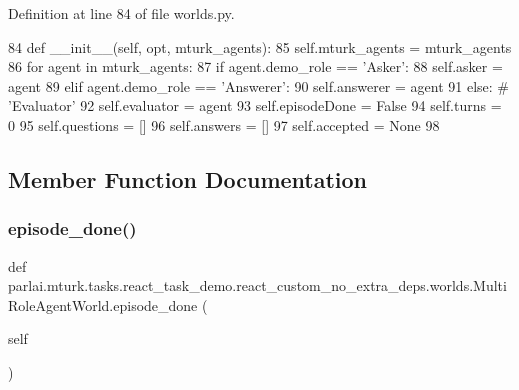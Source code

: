 Definition at line 84 of file worlds.\+py.


\begin{DoxyCode}
84     \textcolor{keyword}{def }\_\_init\_\_(self, opt, mturk\_agents):
85         self.mturk\_agents = mturk\_agents
86         \textcolor{keywordflow}{for} agent \textcolor{keywordflow}{in} mturk\_agents:
87             \textcolor{keywordflow}{if} agent.demo\_role == \textcolor{stringliteral}{'Asker'}:
88                 self.asker = agent
89             \textcolor{keywordflow}{elif} agent.demo\_role == \textcolor{stringliteral}{'Answerer'}:
90                 self.answerer = agent
91             \textcolor{keywordflow}{else}:  \textcolor{comment}{# 'Evaluator'}
92                 self.evaluator = agent
93         self.episodeDone = \textcolor{keyword}{False}
94         self.turns = 0
95         self.questions = []
96         self.answers = []
97         self.accepted = \textcolor{keywordtype}{None}
98 
\end{DoxyCode}


\subsection{Member Function Documentation}
\mbox{\label{classparlai_1_1mturk_1_1tasks_1_1react__task__demo_1_1react__custom__no__extra__deps_1_1worlds_1_1MultiRoleAgentWorld_ae2d3dbca9a3a1651072b65ffbf0f0120}} 
\subsubsection{\texorpdfstring{episode\+\_\+done()}{episode\_done()}}
{\footnotesize\ttfamily def parlai.\+mturk.\+tasks.\+react\+\_\+task\+\_\+demo.\+react\+\_\+custom\+\_\+no\+\_\+extra\+\_\+deps.\+worlds.\+Multi\+Role\+Agent\+World.\+episode\+\_\+done (\begin{DoxyParamCaption}\item[{}]{self }\end{DoxyParamCaption})}



